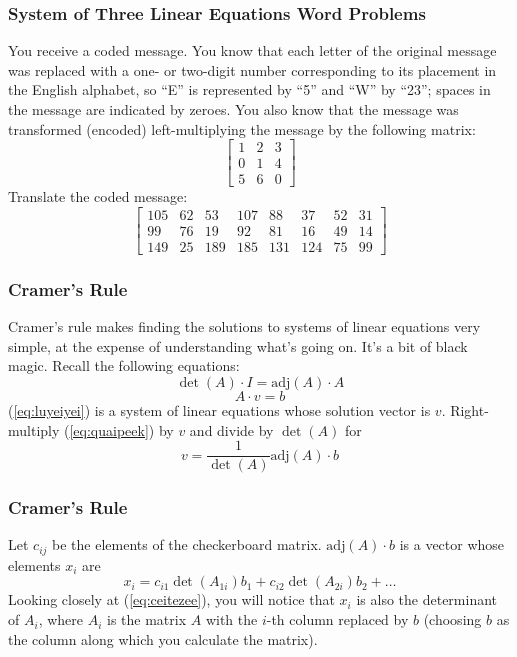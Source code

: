 \documentclass[xcolor=dvipsnames]{beamer}
\begin{document}
\begin{frame}
  \frametitle{System of Three Linear Equations Word Problems}
  {\ubung} You receive a coded message. You know that each letter of
  the original message was replaced with a one- or two-digit number
  corresponding to its placement in the English alphabet, so ``E'' is
  represented by ``5'' and ``W'' by ``23''; spaces in the message are
  indicated by zeroes. You also know that the message was transformed
  (encoded) left-multiplying the message by the following matrix:
\begin{equation}
  \label{eq:iephaeke}
  \left[
    \begin{array}{ccc}
    1 & 2  & 3  \\
    0 & 1  & 4  \\
    5 & 6  & 0 
  \end{array}\right]
\end{equation}
Translate the coded message:
\begin{equation}
  \label{eq:euseeyee}
  \left[
    \begin{array}{cccccccc}
    105   & 62 & 53  & 107 & 88  & 37  & 52 & 31 \\
    99    & 76 & 19  & 92  & 81  & 16  & 49 & 14 \\
    149   & 25 & 189 & 185 & 131 & 124 & 75 & 99
  \end{array}\right]
\end{equation}
\end{frame}

\begin{frame}
  \frametitle{Cramer's Rule}
  Cramer's rule makes finding the solutions to systems of linear
  equations very simple, at the expense of understanding what's going
  on. It's a bit of black magic. Recall the following equations:
  \begin{equation}
    \label{eq:quaipeek}
  \det(A)\cdot{}I=\mbox{adj}(A)\cdot{}A
  \end{equation}
  \begin{equation}
    \label{eq:luyeiyei}
    A\cdot{}v=b
  \end{equation}
(\ref{eq:luyeiyei}) is a system of linear equations whose solution
vector is $v$. Right-multiply (\ref{eq:quaipeek}) by $v$ and divide by
$\det(A)$ for
\begin{equation}
  \label{eq:ohghoyae}
  v=\frac{1}{\det(A)}\mbox{adj}(A)\cdot{}b
\end{equation}
\end{frame}

\begin{frame}
  \frametitle{Cramer's Rule}
Let $c_{ij}$ be the elements of the checkerboard matrix.
$\mbox{adj}(A)\cdot{}b$ is a vector whose elements $x_{i}$ are
\begin{equation}
  \label{eq:ceitezee}
  x_{i}=c_{i1}\det(A_{1i})b_{1}+c_{i2}\det(A_{2i})b_{2}+{\ldots}
\end{equation}
Looking closely at (\ref{eq:ceitezee}), you will notice that $x_{i}$
is also the determinant of $A_{i}$, where $A_{i}$ is the matrix $A$
with the $i$-th column replaced by $b$ (choosing $b$ as the column
along which you calculate the matrix).
\end{frame}
\end{document}
